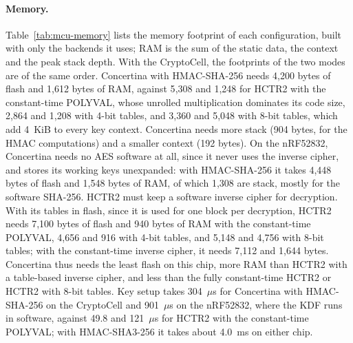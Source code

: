 \paragraph{Memory.}
Table~\ref{tab:mcu-memory} lists the memory footprint of each
configuration, built with only the backends it uses; RAM is the sum of the
static data, the context and the peak stack depth. With the CryptoCell, the
footprints of the two modes are of the same order. Concertina with
HMAC-SHA-256 needs 4{,}200 bytes of flash and
1{,}612 bytes of RAM, against
5{,}308 and 1{,}248 for HCTR2 with the
constant-time POLYVAL, whose unrolled multiplication dominates its code
size, 2{,}864 and 1{,}208 with 4-bit
tables, and 3{,}360 and 5{,}048 with
8-bit tables, which add 4~KiB to every key context. Concertina needs more
stack (904 bytes, for the HMAC computations)
and a smaller context (192 bytes). On the
nRF52832, Concertina needs no AES software at all, since it never uses the
inverse cipher, and stores its working keys unexpanded: with HMAC-SHA-256 it
takes 4{,}448 bytes of flash and
1{,}548 bytes of RAM, of which
1{,}308 are stack, mostly for the software
SHA-256. HCTR2 must keep a software inverse cipher for decryption. With
its tables in flash, since it is used for one block per decryption, HCTR2
needs 7{,}100 bytes of flash and 940
bytes of RAM with the constant-time POLYVAL, 4{,}656 and
916 with 4-bit tables, and 5{,}148
and 4{,}756 with 8-bit tables; with the constant-time
inverse cipher, it needs 7{,}112 and
1{,}644 bytes. Concertina thus needs the least flash on
this chip, more RAM than HCTR2 with a table-based inverse cipher, and less
than the fully constant-time HCTR2 or HCTR2 with 8-bit tables. Key setup takes
304~$\mu$s for Concertina with
HMAC-SHA-256 on the CryptoCell and 901~$\mu$s
on the nRF52832, where the KDF runs in software, against
49.8 and 121~$\mu$s for HCTR2
with the constant-time POLYVAL; with HMAC-SHA3-256 it takes about
4.0~ms on either chip.

